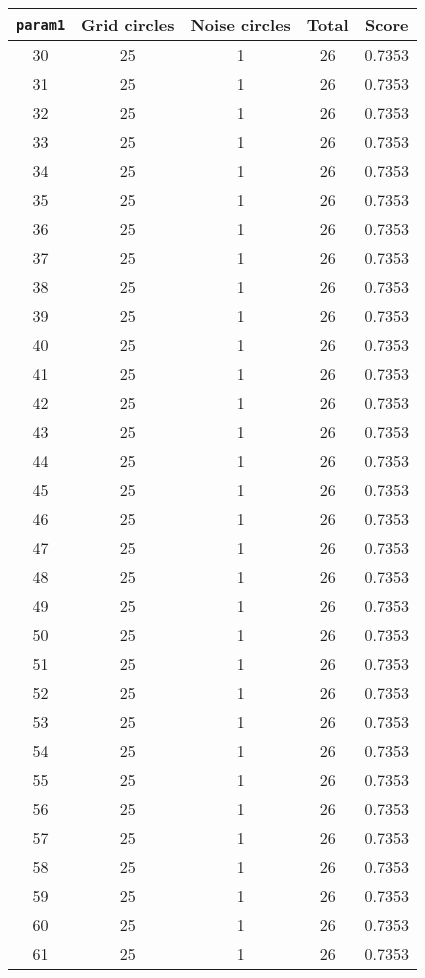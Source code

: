 \documentclass[letterpaper, 12pt]{article}
\begin{document}
\begin{longtable}{|c|c|c|c|c|}
\hline
\textbf{\texttt{param1}} & \textbf{Grid circles} & \textbf{Noise circles} & \textbf{Total} & \textbf{Score} \\
\hline
30 & 25 & 1 & 26 & 0.7353 \\
\hline
31 & 25 & 1 & 26 & 0.7353 \\
\hline
32 & 25 & 1 & 26 & 0.7353 \\
\hline
33 & 25 & 1 & 26 & 0.7353 \\
\hline
34 & 25 & 1 & 26 & 0.7353 \\
\hline
35 & 25 & 1 & 26 & 0.7353 \\
\hline
36 & 25 & 1 & 26 & 0.7353 \\
\hline
37 & 25 & 1 & 26 & 0.7353 \\
\hline
38 & 25 & 1 & 26 & 0.7353 \\
\hline
39 & 25 & 1 & 26 & 0.7353 \\
\hline
40 & 25 & 1 & 26 & 0.7353 \\
\hline
41 & 25 & 1 & 26 & 0.7353 \\
\hline
42 & 25 & 1 & 26 & 0.7353 \\
\hline
43 & 25 & 1 & 26 & 0.7353 \\
\hline
44 & 25 & 1 & 26 & 0.7353 \\
\hline
45 & 25 & 1 & 26 & 0.7353 \\
\hline
46 & 25 & 1 & 26 & 0.7353 \\
\hline
47 & 25 & 1 & 26 & 0.7353 \\
\hline
48 & 25 & 1 & 26 & 0.7353 \\
\hline
49 & 25 & 1 & 26 & 0.7353 \\
\hline
50 & 25 & 1 & 26 & 0.7353 \\
\hline
51 & 25 & 1 & 26 & 0.7353 \\
\hline
52 & 25 & 1 & 26 & 0.7353 \\
\hline
53 & 25 & 1 & 26 & 0.7353 \\
\hline
54 & 25 & 1 & 26 & 0.7353 \\
\hline
55 & 25 & 1 & 26 & 0.7353 \\
\hline
56 & 25 & 1 & 26 & 0.7353 \\
\hline
57 & 25 & 1 & 26 & 0.7353 \\
\hline
58 & 25 & 1 & 26 & 0.7353 \\
\hline
59 & 25 & 1 & 26 & 0.7353 \\
\hline
60 & 25 & 1 & 26 & 0.7353 \\
\hline
61 & 25 & 1 & 26 & 0.7353 \\

\end{longtable}
\end{document}
